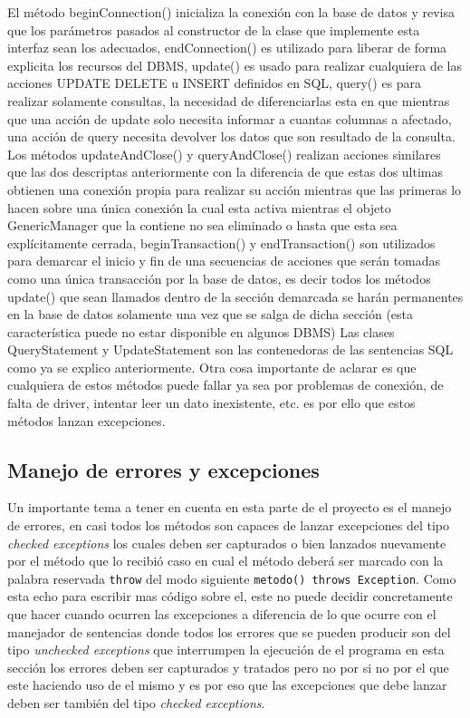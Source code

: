 El método beginConnection() inicializa la conexión con la base de datos y revisa que los parámetros pasados al constructor de la clase que implemente esta interfaz sean los adecuados, endConnection() es utilizado para liberar de forma explicita los recursos del DBMS, update() es usado para realizar cualquiera de las acciones UPDATE DELETE u INSERT definidos en SQL, query() es para realizar solamente consultas, la necesidad de diferenciarlas esta en que mientras que una acción de update solo necesita informar a cuantas columnas a afectado, una acción de query necesita devolver los datos que son resultado de la consulta. Los métodos updateAndClose() y queryAndClose() realizan acciones similares que las dos descriptas anteriormente con la diferencia de que estas dos ultimas obtienen una conexión propia para realizar su acción mientras que las primeras lo hacen sobre una única conexión la cual esta activa mientras el objeto GenericManager que la contiene no sea eliminado o hasta que esta sea explícitamente cerrada, beginTransaction() y endTransaction() son utilizados para demarcar el inicio y fin de una secuencias de acciones que serán tomadas como una única transacción por la base de datos, es decir todos los métodos update() que sean llamados dentro de la sección demarcada se harán permanentes en la base de datos solamente una vez que se salga de dicha sección (esta característica puede no estar disponible en algunos DBMS) Las clases QueryStatement y UpdateStatement son las contenedoras de las sentencias SQL como ya se explico anteriormente. Otra cosa importante de aclarar es que cualquiera de estos métodos puede fallar ya sea por problemas de conexión, de falta de driver, intentar leer un dato inexistente, etc. es por ello que estos métodos lanzan excepciones. 
%
\subsection{Manejo de errores y excepciones}
Un importante tema a tener en cuenta en esta parte de el proyecto es el manejo de errores, en \jd casi todos los métodos son capaces de lanzar excepciones del tipo \textit{checked exceptions} los cuales deben ser capturados o bien lanzados nuevamente por el método que lo recibió caso en cual el método deberá ser marcado con la palabra reservada \verb=throw= del modo siguiente \verb=metodo() throws Exception=. Como \jj esta echo para escribir mas código sobre el, este no puede decidir concretamente que hacer cuando ocurren las excepciones a diferencia de lo que ocurre con el manejador de sentencias donde todos los errores que se pueden producir son del tipo \textit{unchecked exceptions} que interrumpen la ejecución de el programa en esta sección los errores deben ser capturados y tratados pero no por \jj si no por el que este haciendo uso de el mismo y es por eso que las excepciones que debe lanzar \jj deben ser también del tipo \textit{checked exceptions}.


